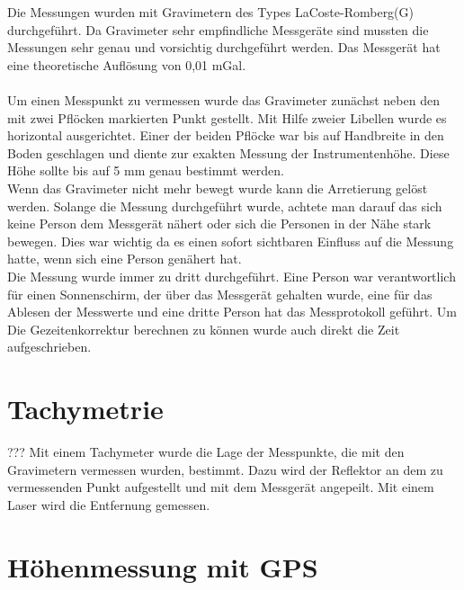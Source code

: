 Die Messungen wurden mit Gravimetern des Types LaCoste-Romberg(G) durchgeführt. Da Gravimeter sehr empfindliche Messgeräte sind mussten die Messungen sehr genau und vorsichtig durchgeführt werden. Das Messgerät hat eine 
theoretische Auflösung von 0,01 mGal.\\
\\
Um einen Messpunkt zu vermessen wurde das Gravimeter zunächst neben den mit zwei Pflöcken markierten Punkt gestellt. Mit Hilfe zweier Libellen wurde es horizontal ausgerichtet. Einer der beiden Pflöcke 
war bis auf Handbreite in den Boden geschlagen und diente zur exakten Messung der Instrumentenhöhe. Diese Höhe sollte bis auf 5 mm genau bestimmt werden.\\
Wenn das Gravimeter nicht mehr bewegt wurde kann die Arretierung gelöst werden. Solange die Messung durchgeführt wurde, achtete man darauf das sich keine Person dem Messgerät nähert oder sich die Personen in der 
Nähe stark bewegen. Dies war wichtig da es einen sofort sichtbaren Einfluss auf die Messung hatte, wenn sich eine Person genähert hat.\\
Die Messung wurde immer zu dritt durchgeführt. Eine Person war verantwortlich für einen Sonnenschirm, der über das Messgerät gehalten wurde, eine für das Ablesen der Messwerte 
und eine dritte Person hat das Messprotokoll geführt. Um Die Gezeitenkorrektur berechnen zu können wurde auch direkt die Zeit aufgeschrieben.\\


\section{Tachymetrie}???
Mit einem Tachymeter wurde die Lage der Messpunkte, die mit den Gravimetern vermessen wurden, bestimmt. Dazu wird der Reflektor an dem zu vermessenden Punkt aufgestellt und mit dem Messgerät angepeilt. Mit einem Laser 
wird die Entfernung gemessen.

\section{Höhenmessung mit GPS}










